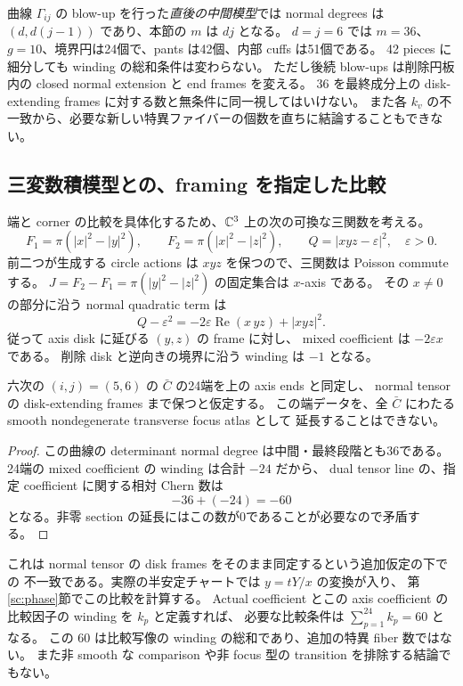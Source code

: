\begin{remark}\label{lc:framing:stage}
曲線 $\Gamma_{ij}$ の blow-up を行った\emph{直後の中間模型}では normal degrees は
$(d,d(j-1))$ であり、本節の $m$ は $dj$ となる。
$d=j=6$ では $m=36$、$g=10$、境界円は24個で、pants は42個、内部 cuffs は51個である。
42 pieces に細分しても winding の総和条件は変わらない。
ただし後続 blow-ups は削除円板内の closed normal extension と end frames を変える。
$36$ を最終成分上の disk-extending frames に対する数と無条件に同一視してはいけない。
また各 $k_v$ の不一致から、必要な新しい特異ファイバーの個数を直ちに結論することもできない。
\end{remark}

\subsection{三変数積模型との、framing を指定した比較}
\label{lc:framing:positive-axis}

端と corner の比較を具体化するため、$\mathbb C^3$ 上の次の可換な三関数を考える。
\[
F_1=\pi(|x|^2-|y|^2),\qquad
F_2=\pi(|x|^2-|z|^2),\qquad
Q=|xyz-\varepsilon|^2,\quad \varepsilon>0.
\]
前二つが生成する circle actions は $xyz$ を保つので、三関数は Poisson commute する。
$J=F_2-F_1=\pi(|y|^2-|z|^2)$ の固定集合は $x$-axis である。
その $x\ne0$ の部分に沿う normal quadratic term は
\[
Q-\varepsilon^2=-2\varepsilon\operatorname{Re}(x\,yz)+|xyz|^2.
\]
従って axis disk に延びる $(y,z)$ の frame に対し、
mixed coefficient は $-2\varepsilon x$ である。
削除 disk と逆向きの境界に沿う winding は $-1$ となる。

\begin{proposition}
\label{lc:framing:positive-mismatch}
六次の $(i,j)=(5,6)$ の $\bar C$ の24端を上の axis ends と同定し、
normal tensor の disk-extending frames まで保つと仮定する。
この端データを、全 $\bar C$ にわたる smooth nondegenerate transverse focus atlas として
延長することはできない。
\end{proposition}

\begin{proof}
この曲線の determinant normal degree は中間・最終段階とも36である。
24端の mixed coefficient の winding は合計 $-24$ だから、
dual tensor line の、指定 coefficient に関する相対 Chern 数は
\[
-36+(-24)=-60
\]
となる。非零 section の延長にはこの数が0であることが必要なので矛盾する。
\end{proof}

これは normal tensor の disk frames をそのまま同定するという追加仮定の下での
不一致である。実際の半安定チャートでは $y=tY/x$ の変換が入り、
第\ref{sc:phase}節でこの比較を計算する。
Actual coefficient とこの axis coefficient の比較因子の winding を $k_p$ と定義すれば、
必要な比較条件は $\sum_{p=1}^{24}k_p=60$ となる。
この $60$ は比較写像の winding の総和であり、追加の特異 fiber 数ではない。
また非 smooth な comparison や非 focus 型の transition を排除する結論でもない。

